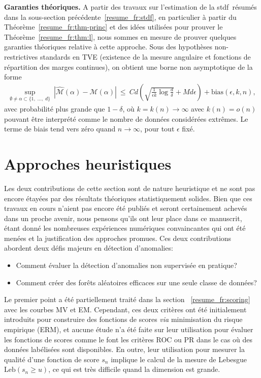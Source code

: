 \documentclass[a4paper, 12pt]{article}
\def\stdf{{\sc stdf}}
\def\leb{\text{Leb}}
\begin{document}
\textbf{Garanties théoriques.}
A partir des travaux sur l'estimation de la \stdf~résumés dans la sous-section précédente~\ref{resume_fr:stdf}, en particulier à partir du Théorème~\ref{resume_fr:thm-princ} et des idées utilisées pour prouver le Théorème~\ref{resume_fr:thm:l}, nous sommes en mesure de prouver quelques garanties théoriques relative à cette approche.
%
Sous des hypothèses non-restrictives standards en TVE (existence de la mesure angulaire et fonctions de répartition des marges continues), on obtient une borne non asymptotique de la forme
\begin{align*}
\sup_{\emptyset \neq \alpha \subset \{1,\; \ldots,\; d \}}~ |\widehat{\mathcal{M}}(\alpha)- \mathcal{M}(\alpha)|
~\le~  C d \left( \sqrt{ \frac{1}{\epsilon k}\log\frac{d}{\delta}} + M d\epsilon \right) + \text{bias}(\epsilon, k, n),
\end{align*}
avec probabilité plus grande que $1-\delta$, où $k = k(n) \to \infty$ avec $k(n) = o(n)$ pouvant être interprété comme le nombre de données considérées extrêmes.
Le terme de biais tend vers zéro quand $n \to \infty$, pour tout $\epsilon$ fixé.


\section{Approches heuristiques}
\label{resume_fr:sec:heuristic}

Les deux contributions de cette section sont de nature heuristique et ne sont pas encore étayées par des résultats théoriques statistiquement solides. Bien que ces travaux en cours n'aient pas encore été publiés et seront certainement achevés dans un proche avenir, nous pensons qu'ils ont leur place dans ce manuscrit, étant donné les nombreuses expériences numériques convaincantes qui ont été menées et la justification des approches promues.
%
Ces deux contributions abordent deux défis majeurs en détection d'anomalies:

\begin{itemize}
\item Comment évaluer la détection d'anomalies non supervisée en pratique?
\item Comment créer des forêts aléatoires efficaces sur une seule classe de données?
\end{itemize}

Le premier point a été partiellement traité dans la section ~\ref{resume_fr:scoring} avec les courbes MV et EM.
Cependant, ces deux critères ont été initialement introduits pour construire des fonctions de scores \emph{via} minimisation du risque empirique (ERM), et aucune étude n'a été faite sur leur utilisation pour évaluer les fonctions de scores comme le font les critères ROC ou PR dans le cas où des données labélisées sont disponibles.
En outre, leur utilisation pour mesurer la qualité d'une fonction de score $s_n$ implique le calcul de la mesure de Lebesgue $\leb(s_n\ge u) $, ce qui est très difficile quand la dimension est grande.
\end{document}

